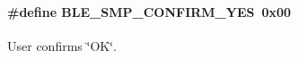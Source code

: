\paragraph[{\texorpdfstring{B\+L\+E\+\_\+\+S\+M\+P\+\_\+\+C\+O\+N\+F\+I\+R\+M\+\_\+\+Y\+ES}{BLE_SMP_CONFIRM_YES}}]{\setlength{\rightskip}{0pt plus 5cm}\#define B\+L\+E\+\_\+\+S\+M\+P\+\_\+\+C\+O\+N\+F\+I\+R\+M\+\_\+\+Y\+ES~0x00}\hypertarget{group___b_l_e___s_m_p___c_o_n_f_i_r_m_ga492ddfb291acea641b8519031ea2a21d}{}\label{group___b_l_e___s_m_p___c_o_n_f_i_r_m_ga492ddfb291acea641b8519031ea2a21d}
User confirms \char`\"{}\+O\+K\char`\"{}. 
